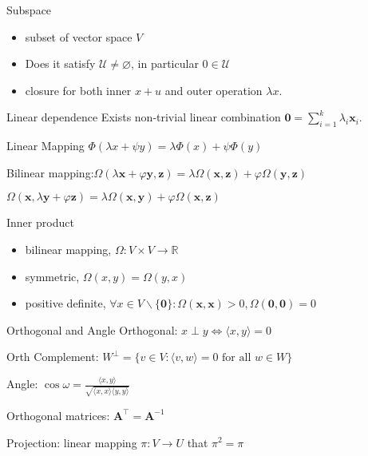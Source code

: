 \documentclass[UTF8,a4paper]{article}
\begin{document}
\begin{cheatsheetblock}{Subspace}
    \begin{itemize}
        \item subset of vector space $V$
        \item Does it satisfy $\mathcal{U} \neq \varnothing$, in particular $0 \in \mathcal{U}$
        \item closure for both inner $x + u$ and outer operation $\lambda x$.
    \end{itemize}
\end{cheatsheetblock}

\begin{cheatsheetblock}{Linear dependence}
    Exists non-trivial linear combination $\mathbf{0}=\sum_{i=1}^k \lambda_i \boldsymbol{x}_i$.
\end{cheatsheetblock}

\begin{cheatsheetblock}{Linear Mapping}
    $\Phi(\lambda x+\psi y)=\lambda \Phi(x)+\psi \Phi(y)$

    Bilinear mapping:\hfill $\Omega(\lambda \boldsymbol{x}+\varphi \boldsymbol{y}, \boldsymbol{z})=\lambda \Omega(\boldsymbol{x}, \boldsymbol{z})+\varphi \Omega(\boldsymbol{y}, \boldsymbol{z})$

    \hfill$\Omega(\boldsymbol{x}, \lambda \boldsymbol{y}+\varphi \boldsymbol{z})=\lambda \Omega(\boldsymbol{x}, \boldsymbol{y})+\varphi \Omega(\boldsymbol{x}, \boldsymbol{z})$
\end{cheatsheetblock}

\begin{cheatsheetblock}{Inner product}
    \begin{itemize}
        \item bilinear mapping, \hfill $\Omega: V \times V \rightarrow \mathbb{R}$
        \item symmetric, \hfill $\Omega(x, y)=\Omega(y, x)$
        \item positive definite, \hfill $\forall x \in V \backslash\{\mathbf{0}\}: \Omega(\boldsymbol{x}, \boldsymbol{x})>0, \Omega(\mathbf{0}, \mathbf{0})=0$
    \end{itemize}
\end{cheatsheetblock}

\begin{cheatsheetblock}{Orthogonal and Angle}
    Orthogonal: \hfill $x \perp y \Leftrightarrow \langle x, y\rangle=0$

    Orth Complement: \hfill $W^\perp = \{ v \in V : \langle v, w \rangle = 0 \text{ for all } w \in W \}$

    Angle: \hfill $\cos \omega=\frac{\langle x, y\rangle}{\sqrt{\langle x, x\rangle\langle y, y\rangle}}$

    Orthogonal matrices: \hfill $\bm{A}^{\top} = \bm{A}^{-1}$

    Projection: linear mapping $\pi: V \rightarrow U$ that \hfill $\pi^{2}=\pi$
\end{cheatsheetblock}
\end{document}
